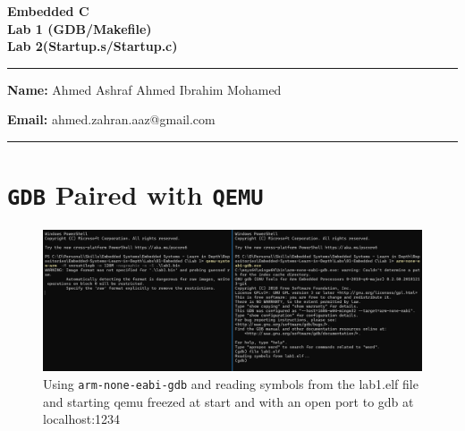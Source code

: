\documentclass[12pt]{article}
\numberwithin{figure}{section}
\numberwithin{table}{section}
\numberwithin{listing}{section}
\begin{document}
	\begin{titlepage}
		\centering
		\vspace*{2cm}
		\begin{center}
		\LARGE\textbf{Embedded C\\Lab 1 (GDB/Makefile)\\Lab 2(Startup.s/Startup.c)}
		\end{center}
		\vspace{1cm}
		
		\large\textbf{}
		
		\vspace{2cm}
		\hrule
		\vspace{0.5cm}
		
		\textbf{Name:} Ahmed Ashraf Ahmed Ibrahim Mohamed
		
		\textbf{Email:} ahmed.zahran.aaz@gmail.com
		
		
		\vspace{0.5cm}
		\hrule
		\vspace{2cm}
	\end{titlepage}
	\hypersetup{linkcolor=documentHyperlinks}
\section{\texttt{GDB} Paired with \texttt{QEMU}}
\begin{figure}[h]
	\centering
	\includegraphics[width=\textwidth]{Media/gdbup.jpg}
	\caption{Using \texttt{arm-none-eabi-gdb} and reading symbols from the lab1.elf file and starting qemu freezed at start and with an open port to gdb at localhost:1234} 
	\label{fig:figurename} 
\end{figure}

\end{document}
